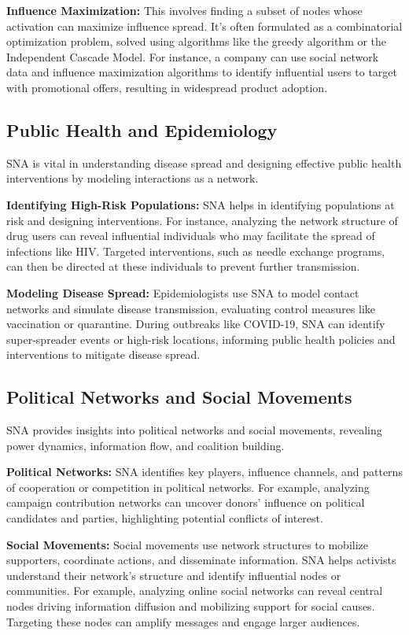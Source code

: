 \documentclass[12pt]{book} %
\begin{document}
\textbf{Influence Maximization:}
This involves finding a subset of nodes whose activation can maximize influence spread. It's often formulated as a combinatorial optimization problem, solved using algorithms like the greedy algorithm or the Independent Cascade Model. For instance, a company can use social network data and influence maximization algorithms to identify influential users to target with promotional offers, resulting in widespread product adoption.

\subsection{Public Health and Epidemiology}

SNA is vital in understanding disease spread and designing effective public health interventions by modeling interactions as a network.

\textbf{Identifying High-Risk Populations:}
SNA helps in identifying populations at risk and designing interventions. For instance, analyzing the network structure of drug users can reveal influential individuals who may facilitate the spread of infections like HIV. Targeted interventions, such as needle exchange programs, can then be directed at these individuals to prevent further transmission.

\textbf{Modeling Disease Spread:}
Epidemiologists use SNA to model contact networks and simulate disease transmission, evaluating control measures like vaccination or quarantine. During outbreaks like COVID-19, SNA can identify super-spreader events or high-risk locations, informing public health policies and interventions to mitigate disease spread.

\subsection{Political Networks and Social Movements}

SNA provides insights into political networks and social movements, revealing power dynamics, information flow, and coalition building.

\textbf{Political Networks:}
SNA identifies key players, influence channels, and patterns of cooperation or competition in political networks. For example, analyzing campaign contribution networks can uncover donors' influence on political candidates and parties, highlighting potential conflicts of interest.

\textbf{Social Movements:}
Social movements use network structures to mobilize supporters, coordinate actions, and disseminate information. SNA helps activists understand their network's structure and identify influential nodes or communities. For example, analyzing online social networks can reveal central nodes driving information diffusion and mobilizing support for social causes. Targeting these nodes can amplify messages and engage larger audiences.
\end{document}
